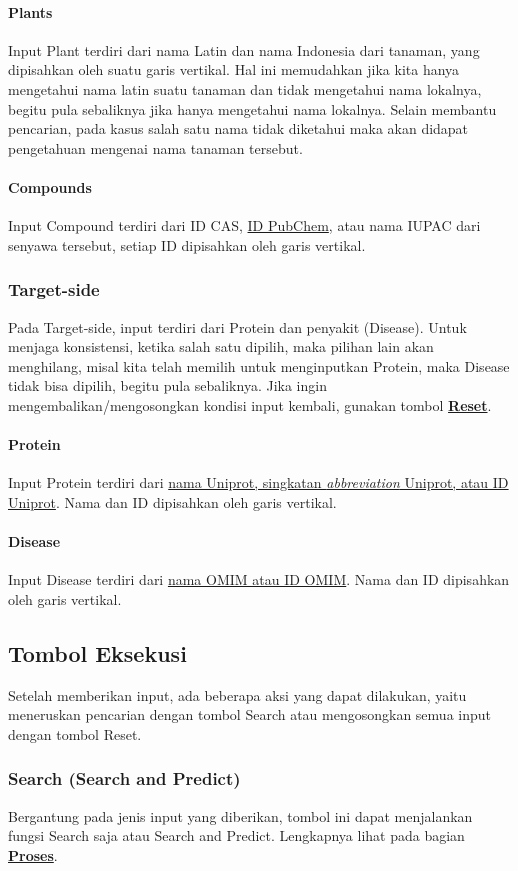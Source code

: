 			\paragraph{Plants}
			Input Plant terdiri dari nama Latin dan nama Indonesia dari tanaman, yang dipisahkan oleh suatu garis vertikal. Hal ini memudahkan jika kita hanya mengetahui nama latin suatu tanaman dan tidak mengetahui nama lokalnya, begitu pula sebaliknya jika hanya mengetahui nama lokalnya. Selain membantu pencarian, pada kasus salah satu nama tidak diketahui maka akan didapat pengetahuan mengenai nama tanaman tersebut.
			\paragraph{Compounds}
			Input Compound terdiri dari ID CAS, \hyperref[pubchem]{ID PubChem}, atau nama IUPAC dari senyawa tersebut, setiap ID dipisahkan oleh garis vertikal. 
		\subsubsection{Target-side} \label{sssec:target input}
		Pada Target-side, input terdiri dari Protein dan penyakit (Disease). Untuk menjaga konsistensi, ketika salah satu dipilih, maka pilihan lain akan menghilang, misal kita telah memilih untuk menginputkan Protein, maka Disease tidak bisa dipilih, begitu pula sebaliknya. Jika ingin mengembalikan/mengosongkan kondisi input kembali, gunakan tombol \hyperref[reset]{\textbf{Reset}}.
			\paragraph{Protein}
			Input Protein terdiri dari \hyperref[uniprot]{nama Uniprot, singkatan \emph{abbreviation} Uniprot, atau ID Uniprot}. Nama dan ID dipisahkan oleh garis vertikal.
			\paragraph{Disease}
			Input Disease terdiri dari \hyperref[omim]{nama OMIM atau ID OMIM}. Nama dan ID dipisahkan oleh garis vertikal.

	\subsection{Tombol Eksekusi}
	Setelah memberikan input, ada beberapa aksi yang dapat dilakukan, yaitu meneruskan pencarian dengan tombol Search atau mengosongkan semua input dengan tombol Reset.
		\subsubsection{Search (Search and Predict)} \label{sssec:search}
		Bergantung pada jenis input yang diberikan, tombol ini dapat menjalankan fungsi Search saja atau Search and Predict. Lengkapnya lihat pada bagian \hyperref[process]{\textbf{Proses}}.
